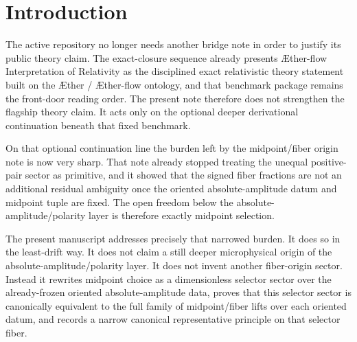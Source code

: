 \documentclass[11pt]{article}
\newcommand{\Aether}{\AE{}ther}
\newcommand{\Aflow}{\AE{}ther-flow}
\newcommand{\TheoryName}{\Aflow{} Interpretation of Relativity}
\newcommand{\AbsReadAmp}{\chi_{\mathrm{br}}^{q}}
\newcommand{\AbsScaleAmp}{\omega_{\mathrm{br}}}
\newcommand{\PolRead}{\epsilon_{\mathrm{br}}^{q}}
\newcommand{\PolScale}{\sigma_{\mathrm{br}}}
\newcommand{\MidRead}{C_{q}}
\newcommand{\MidScale}{C_{\omega}}
\newcommand{\FiberRead}{\Theta_{q}}
\newcommand{\FiberScale}{\Theta_{\omega}}
\begin{document}
\begin{abstract}
The decisive downstream fact is selector-blindness. For every selector tuple,
\[
2\MidRead\FiberRead=\PolRead\AbsReadAmp,
\qquad
\ldots
\qquad
2\MidScale\FiberScale=\PolScale\AbsScaleAmp.
\]
Therefore the same signed amplitudes, the same primitive class, the same raw-orbit lift, the same phase-neutral minimizing branch, the same canonical profile, and the same downstream package are recovered exactly. No genuine positive-modulus quotient and no vacuum-angle locking appear. The current verdict therefore remains in force: the positive scale orbit is still a canonical-normalization orbit rather than a proved redundancy, and the global \(O(2)\) vacuum angle remains residual.

The claim boundary is strict. This note does not derive the balanced midpoint selector from a still deeper substrate action, quotient, or locking mechanism. Its narrower result is that once midpoint freedom has been isolated sharply, the active line already admits a disciplined canonical midpoint representative that preserves the already-frozen downstream package exactly.
\end{abstract}

\section{Introduction}

The active repository no longer needs another bridge note in order to justify its public theory claim. The exact-closure sequence already presents \TheoryName{} as the disciplined exact relativistic theory statement built on the \Aether{} / \Aflow{} ontology, and that benchmark package remains the front-door reading order. The present note therefore does not strengthen the flagship theory claim. It acts only on the optional deeper derivational continuation beneath that fixed benchmark.

On that optional continuation line the burden left by the midpoint/fiber origin note is now very sharp. That note already stopped treating the unequal positive-pair sector as primitive, and it showed that the signed fiber fractions are not an additional residual ambiguity once the oriented absolute-amplitude datum and midpoint tuple are fixed. The open freedom below the absolute-amplitude/polarity layer is therefore exactly midpoint selection.

The present manuscript addresses precisely that narrowed burden. It does so in the least-drift way. It does not claim a still deeper microphysical origin of the absolute-amplitude/polarity layer. It does not invent another fiber-origin sector. Instead it rewrites midpoint choice as a dimensionless selector sector over the already-frozen oriented absolute-amplitude data, proves that this selector sector is canonically equivalent to the full family of midpoint/fiber lifts over each oriented datum, and records a narrow canonical representative principle on that selector fiber.
\end{document}
